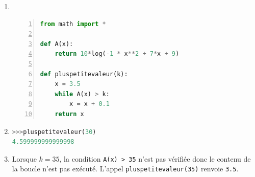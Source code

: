 \documentclass[10pt]{article}
\begin{document}
\begin{enumerate}
	\item \ {} 
	
\begin{center}
\begin{lstlisting}[language=python,frame=single, escapechar=|, numbers=left]
from math import *	

def A(x):
	return 10*log(-1 * x**2 + 7*x + 9)
	
def pluspetitevaleur(k):
	x = 3.5
	while A(x) > k:
		x = x + 0.1
	return x	

\end{lstlisting}
\end{center}
	
	\item
	\begin{lstlisting}[language=python]
>>>pluspetitevaleur(30)
4.599999999999998
\end{lstlisting}
	
	\item Lorsque $k=35$, la condition \verb!A(x) > 35! n'est pas vérifiée donc le contenu de la boucle n'est pas exécuté. L'appel \verb!pluspetitevaleur(35)! renvoie \verb!3.5!.
\end{enumerate}
\end{document}
